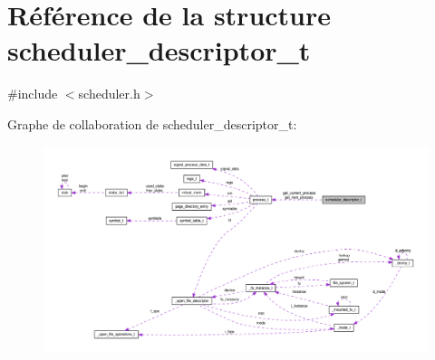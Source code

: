 \hypertarget{structscheduler__descriptor__t}{\section{Référence de la structure scheduler\-\_\-descriptor\-\_\-t}
\label{structscheduler__descriptor__t}
}


{\ttfamily \#include $<$scheduler.\-h$>$}



Graphe de collaboration de scheduler\-\_\-descriptor\-\_\-t\-:\nopagebreak
\begin{figure}[H]
\begin{center}
\leavevmode
\includegraphics[width=350pt]{structscheduler__descriptor__t__coll__graph}
\end{center}
\end{figure}
